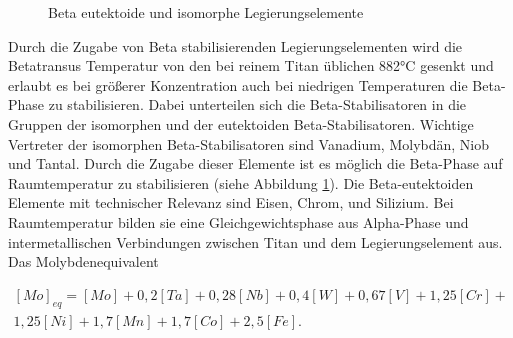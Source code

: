 \documentclass[a4paper, 11pt]{tubsreprt}
\begin{document}
\begin{figure}
\caption{Beta eutektoide und isomorphe Legierungselemente}
\label{Beta eutektisch isomorphe legierungselemente}
\end{figure}

Durch die Zugabe von Beta stabilisierenden Legierungselementen wird die Betatransus Temperatur von den bei reinem Titan üblichen 882°C gesenkt und erlaubt es bei größerer Konzentration auch bei niedrigen Temperaturen die Beta-Phase zu stabilisieren. Dabei unterteilen sich die Beta-Stabilisatoren in die Gruppen der isomorphen und der eutektoiden Beta-Stabilisatoren.
Wichtige Vertreter der isomorphen Beta-Stabilisatoren sind Vanadium, Molybdän, Niob und Tantal. Durch die Zugabe dieser Elemente ist es möglich die Beta-Phase auf Raumtemperatur zu stabilisieren (siehe Abbildung \ref{Beta eutektisch isomorphe legierungselemente}).
Die Beta-eutektoiden Elemente mit technischer Relevanz sind Eisen, Chrom, und Silizium. Bei Raumtemperatur bilden sie eine Gleichgewichtsphase aus Alpha-Phase und intermetallischen Verbindungen zwischen Titan und dem Legierungselement aus. Das Molybdenequivalent

\begin{equation}
\begin{split}
[Mo]_{eq}=[Mo]+0,2[Ta]+0,28[Nb]+0,4[W]+0,67[V]+1,25[Cr]+ \\
1,25[Ni]+1,7[Mn]+1,7[Co]+2,5[Fe].
\end{split}
\label{Molybdenequivalent}
\end{equation}
\end{document}
